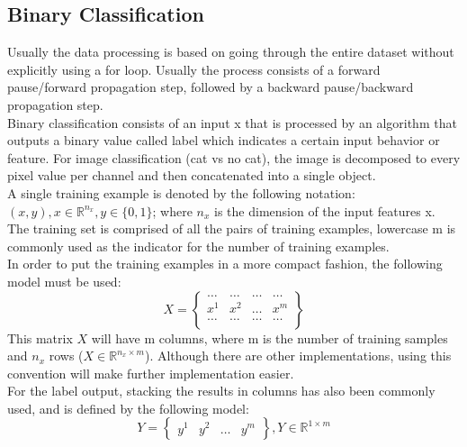 \documentclass[11pt]{report}
\begin{document}
\subsection*{Binary Classification}
Usually the data processing is based on going through the entire dataset without explicitly using a for loop. Usually the process consists of a forward pause/forward propagation step, followed by a backward pause/backward propagation step.\\
Binary classification consists of an input x that is processed by an algorithm that outputs a binary value called label which indicates a certain input behavior or feature. For image classification (cat vs no cat), the image is decomposed to every pixel value per channel and then concatenated into a single object. \\
A single training example is denoted by the following notation:\\
$(x,y), x \in \mathbb{R}^{n_x}, y \in \{0,1\}$; where $n_x$ is the dimension of the input features x.\\
The training set is comprised of all the pairs of training examples, lowercase m is commonly used as the indicator for the number of training examples.\\
In order to put the training examples in a more compact fashion, the following model must be used:
\begin{equation}
	X =
	\begin{Bmatrix} 
	\dots & \dots & \dots & \dots\\
	x^1 & x^2 & \dots & x^m \\
	\dots & \dots & \dots & \dots\\
	\end{Bmatrix} 
 \end{equation}
This matrix $X$ will have m columns, where m is the number of training samples and $n_x$ rows ($X \in \mathbb{R}^{n_x \times m}$). Although there are other implementations, using this convention will make further implementation easier.\\
For the label output, stacking the results in columns has also been commonly used, and is defined by the following model:
\begin{equation}
	Y =
	\begin{Bmatrix} 
	y^1 & y^2 & \dots & y^m
	\end{Bmatrix}
	, Y \in \mathbb{R}^{1 \times m} 
 \end{equation}
\end{document}
